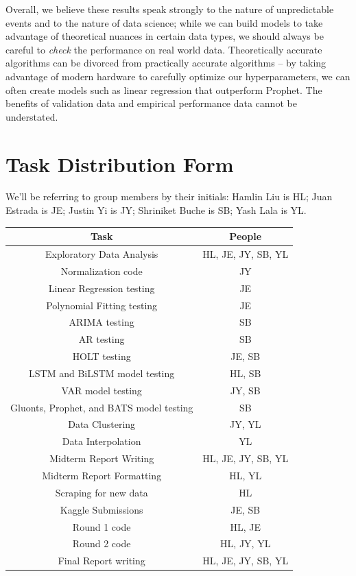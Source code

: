 \documentclass[sigconf,nonacm]{acmart}
\begin{document}
Overall, we believe these results speak strongly to the nature of unpredictable
events and to the nature of data science; while we can build models to take
advantage of theoretical nuances in certain data types, we should always be
careful to \emph{check} the performance on real world data. Theoretically
accurate algorithms can be divorced from practically accurate algorithms -- by
taking advantage of modern hardware to carefully optimize our hyperparameters,
we can often create models such as linear regression that outperform Prophet.
The benefits of validation data and empirical performance data cannot be
understated. 


\section{Task Distribution Form}

We'll be referring to group members by their initials: Hamlin Liu is HL; Juan
Estrada is JE; Justin Yi is JY; Shriniket Buche is SB; Yash Lala is YL. 

\begin{table}[h!]
    \centering
    \begin{tabular}{|c|c|}
        \hline
         Task & People  \\
         \hline \hline
         Exploratory Data Analysis & HL, JE, JY, SB, YL \\
         \hline
         Normalization code & JY \\
         \hline
         Linear Regression testing & JE \\
         \hline
         Polynomial Fitting testing & JE \\
         \hline
         ARIMA testing & SB \\
         \hline
         AR testing & SB \\
         \hline
         HOLT testing & JE, SB \\
         \hline
         LSTM and BiLSTM model testing & HL, SB  \\
         \hline
         VAR model testing & JY, SB \\
         \hline
         Gluonts, Prophet, and BATS model testing & SB \\
         \hline
         Data Clustering & JY, YL \\
         \hline
         Data Interpolation & YL \\
         \hline
         Midterm Report Writing & HL, JE, JY, SB, YL \\
         \hline
         Midterm Report Formatting & HL, YL \\
         \hline
         Scraping for new data & HL \\
         \hline
         Kaggle Submissions & JE, SB \\
         \hline
         Round 1 code & HL, JE \\
         \hline
         Round 2 code & HL, JY, YL \\
         \hline
         Final Report writing & HL, JE, JY, SB, YL \\
         \hline
    \end{tabular}
\end{table}




\end{document}
